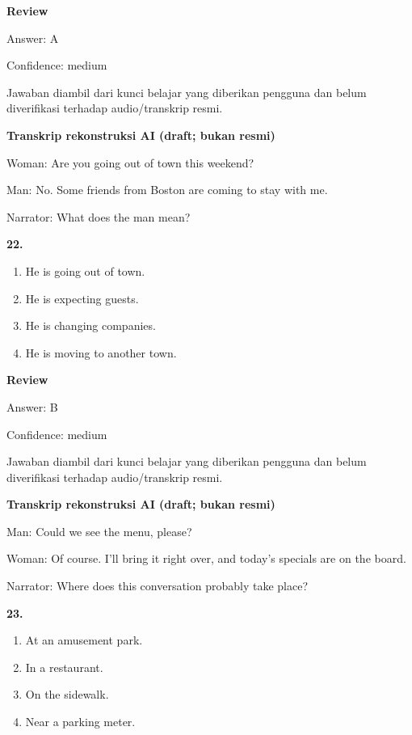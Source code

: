 \documentclass[12pt]{article}
\begin{document}
\setlength{\parskip}{0pt}
\setlength{\parindent}{0pt}
\textbf{Review}\par
Answer: A\par
Confidence: medium\par
Jawaban diambil dari kunci belajar yang diberikan pengguna dan belum diverifikasi terhadap audio/transkrip resmi.\par
\endgroup
\par
\vspace{0.25\baselineskip}
\begin{exampleblock}
\textbf{Transkrip rekonstruksi AI (draft; bukan resmi)}\par
Woman: Are you going out of town this weekend?\par
Man: No. Some friends from Boston are coming to stay with me.\par
Narrator: What does the man mean?\par
\end{exampleblock}
\noindent\textbf{22.}
\begin{enumerate}[label=(\Alph*),leftmargin=*,itemsep=0.2em]
\item He is going out of town.
\item He is expecting guests.
\item He is changing companies.
\item He is moving to another town.
\end{enumerate}
\par
\begingroup
\setlength{\parskip}{0pt}
\setlength{\parindent}{0pt}
\textbf{Review}\par
Answer: B\par
Confidence: medium\par
Jawaban diambil dari kunci belajar yang diberikan pengguna dan belum diverifikasi terhadap audio/transkrip resmi.\par
\endgroup
\par
\vspace{0.25\baselineskip}
\begin{exampleblock}
\textbf{Transkrip rekonstruksi AI (draft; bukan resmi)}\par
Man: Could we see the menu, please?\par
Woman: Of course. I'll bring it right over, and today's specials are on the board.\par
Narrator: Where does this conversation probably take place?\par
\end{exampleblock}
\noindent\textbf{23.}
\begin{enumerate}[label=(\Alph*),leftmargin=*,itemsep=0.2em]
\item At an amusement park.
\item In a restaurant.
\item On the sidewalk.
\item Near a parking meter.
\end{enumerate}
\end{document}
